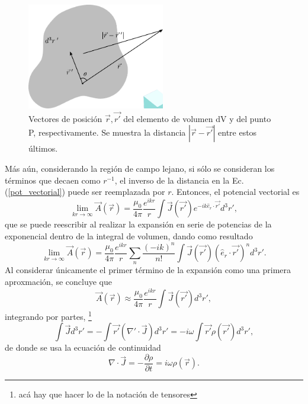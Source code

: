 \begin{figure}[h!]
	\includegraphics[width=6cm]{../../Figuras/aprox}
	\caption{Vectores de posición $\Vec{r},\Vec{r'}$ del elemento de volumen dV y del punto P, respectivamente. Se muestra la distancia $|\Vec{r}-\Vec{r'}|$ entre estos últimos. }
\end{figure}
 Más aún, considerando la región de campo lejano, si sólo se consideran los términos que decaen como $r^{-1}$, el inverso de la distancia en la Ec.(\ref{pot_vectorial}) puede ser reemplazada por $r$. Entonces, el potencial vectorial es
\begin{equation*}
    \lim_{kr\rightarrow\infty}\Vec{A}(\Vec{r})=\frac{\mu_0}{4\pi}\frac{e^{ikr}}{r}\int \Vec{J}(\Vec{r'})e^{-ik\hat{e}_r\cdot\Vec{r'}}d^3r',    
\end{equation*}
que se puede reescribir al realizar la expansión en serie de potencias de la exponencial dentro de la integral de volumen, dando como resultado
\begin{equation*}
    \lim_{kr\rightarrow\infty}\Vec{A}(\Vec{r})=\frac{\mu_0}{4\pi}\frac{e^{ikr}}{r}\sum_n\frac{(-ik)^n}{n!}\int \Vec{J}(\Vec{r'})(\hat{e}_r\cdot\Vec{r'})^n d^3r'.    
\end{equation*}
Al considerar únicamente el primer término de la expansión como una primera aproxmación, se concluye que 
\begin{equation}
    \Vec{A}(\Vec{r})\approx\frac{\mu_0}{4\pi}\frac{e^{ikr}}{r}\int \Vec{J}(\Vec{r'}) d^3r',    
    \label{aprox_pot_vec}
\end{equation}
integrando por partes, \footnote{acá hay que hacer lo de la notación de tensores}
\begin{equation}
	\int\Vec{J}d^3r'=-\int \Vec{r'}(\nabla'\cdot\Vec{J})d^3r'=-i\omega\int \Vec{r'}\rho(\Vec{r'})d^3r',
	\label{Jrho}
\end{equation}
de donde se usa la ecuación de continuidad 
\begin{equation*}
    \nabla\cdot\Vec{J}=-\frac{\partial\rho}{\partial t}=i\omega\rho(\Vec{r}). 
\end{equation*}
